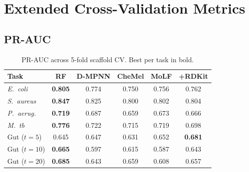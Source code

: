 \documentclass{article}
\begin{document}
\begin{table}[ht]
\caption{Scaffold split fold sizes and active fraction per fold.}
\label{tab:fold_balance}
\centering
\scriptsize
{}
\end{table}


\section{Extended Cross-Validation Metrics}
\label{app:extended_metrics}

\subsection{PR-AUC}

\begin{table}[ht]
\caption{PR-AUC across 5-fold scaffold CV. Best per task in bold.}
\label{tab:prauc}
\centering
\scriptsize
\begin{tabular}{lccccc}
\toprule
\textbf{Task} & \textbf{RF} & \textbf{D-MPNN} & \textbf{CheMel} & \textbf{MoLF} & \textbf{+RDKit} \\
\midrule
\textit{E.~coli}      & \textbf{0.805} & 0.774 & 0.750 & 0.756 & 0.762 \\
\textit{S.~aureus}    & \textbf{0.847} & 0.825 & 0.800 & 0.802 & 0.804 \\
\textit{P.~aerug.}    & \textbf{0.719} & 0.687 & 0.659 & 0.673 & 0.666 \\
\textit{M.~tb}        & \textbf{0.776} & 0.722 & 0.715 & 0.719 & 0.698 \\
\midrule
Gut ($t{=}5$)  & 0.645 & 0.647 & 0.631 & 0.652 & \textbf{0.681} \\
Gut ($t{=}10$) & \textbf{0.665} & 0.597 & 0.615 & 0.587 & 0.643 \\
Gut ($t{=}20$) & \textbf{0.685} & 0.643 & 0.659 & 0.608 & 0.657 \\
\bottomrule
\end{tabular}
\end{table}
\end{document}
